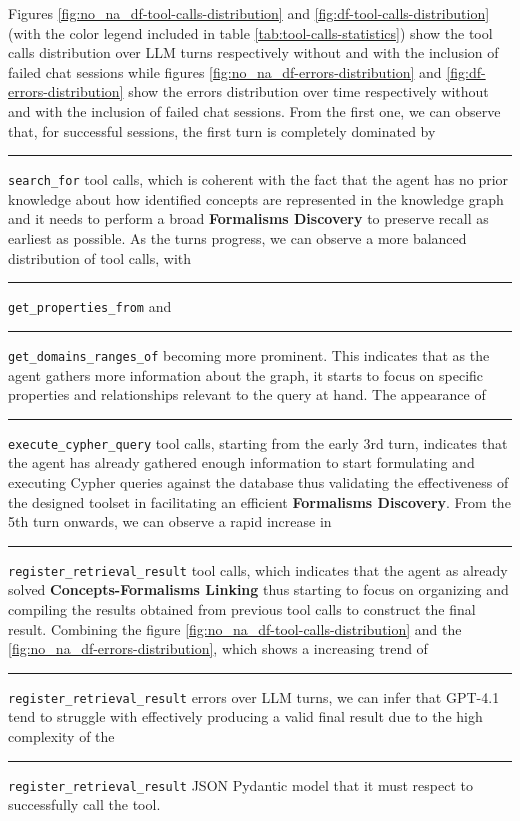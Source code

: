 Figures \ref{fig:no_na_df-tool-calls-distribution} and \ref{fig:df-tool-calls-distribution} (with the color legend included in table \ref{tab:tool-calls-statistics}) show the tool calls distribution over LLM turns respectively without and with the inclusion of failed chat sessions while figures \ref{fig:no_na_df-errors-distribution} and \ref{fig:df-errors-distribution} show the errors distribution over time respectively without and with the inclusion of failed chat sessions. From the first one, we can observe that, for successful sessions, the first turn is completely dominated by \textcolor{search\_for}{\rule{8pt}{4pt}}\texttt{search\_for} tool calls, which is coherent with the fact that the agent has no prior knowledge about how identified concepts are represented in the knowledge graph and it needs to perform a broad \textbf{Formalisms Discovery} to preserve recall as earliest as possible. As the turns progress, we can observe a more balanced distribution of tool calls, with \textcolor{get\_properties\_from}{\rule{8pt}{4pt}}\texttt{get\_properties\_from} and \textcolor{get\_domains\_ranges\_of}{\rule{8pt}{4pt}}\texttt{get\_domains\_ranges\_of} becoming more prominent. This indicates that as the agent gathers more information about the graph, it starts to focus on specific properties and relationships relevant to the query at hand. The appearance of \textcolor{execute\_cypher\_query}{\rule{8pt}{4pt}}\texttt{execute\_cypher\_query} tool calls, starting from the early 3rd turn, indicates that the agent has already gathered enough information to start formulating and executing Cypher queries against the database thus validating the effectiveness of the designed toolset in facilitating an efficient \textbf{Formalisms Discovery}. From the 5th turn onwards, we can observe a rapid increase in \textcolor{register\_retrieval\_result}{\rule{8pt}{4pt}}\texttt{register\_retrieval\_result} tool calls, which indicates that the agent as already solved \textbf{Concepts-Formalisms Linking} thus starting to focus on organizing and compiling the results obtained from previous tool calls to construct the final result. Combining the figure \ref{fig:no_na_df-tool-calls-distribution} and the \ref{fig:no_na_df-errors-distribution}, which shows a increasing trend of \textcolor{register\_retrieval\_result}{\rule{8pt}{4pt}}\texttt{register\_retrieval\_result} errors over LLM turns, we can infer that GPT-4.1 tend to struggle with effectively producing a valid final result due to the high complexity of the \textcolor{register\_retrieval\_result}{\rule{8pt}{4pt}}\texttt{register\_retrieval\_result} JSON Pydantic model that it must respect to successfully call the tool.

